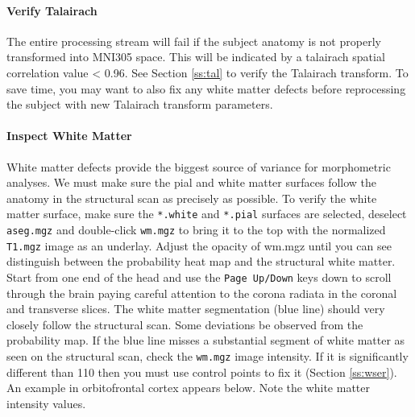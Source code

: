 \documentclass[paper=a4, fontsize=11pt]{scrartcl} %
\numberwithin{equation}{section} %
\numberwithin{figure}{section} %
\numberwithin{table}{section} %
\begin{document}
\paragraph{Verify Talairach}  The entire processing stream will fail if the subject anatomy is not properly transformed into MNI305 space. This will be indicated by a talairach spatial correlation value < 0.96. See Section \ref{ss:tal} to verify the Talairach transform.  To save time, you may want to also fix any white matter defects before reprocessing the subject with new Talairach transform parameters.

\paragraph{Inspect White Matter} White matter defects provide the biggest source of variance for morphometric analyses.  We must make sure the pial and white matter surfaces follow the anatomy in the structural scan as precisely as possible. To verify the white matter surface, make sure the \texttt{*.white} and \texttt{*.pial} surfaces are selected, deselect \texttt{aseg.mgz} and double-click \texttt{wm.mgz} to bring it to the top with the normalized \texttt{T1.mgz} image as an underlay.  Adjust the opacity of wm.mgz until you can see distinguish between the probability heat map and the structural white matter.  Start from one end of the head and use the \texttt{Page Up/Down} keys down to scroll through the brain paying careful attention to the corona radiata in the coronal and transverse slices.  The white matter segmentation (blue line) should very closely follow the structural scan.  Some deviations be observed from the probability map.  If the blue line misses a substantial segment of white matter as seen on the structural scan, check the \texttt{wm.mgz} image intensity.  If it is significantly different than 110 then you must use control points to fix it (Section \ref{ss:wser}).  An example in orbitofrontal cortex appears below.  Note the white matter intensity values. \\ 
\end{document}
